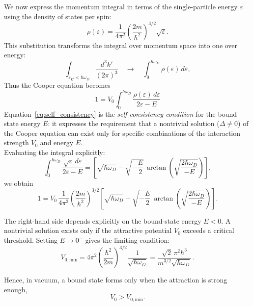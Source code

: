 We now express the momentum integral in terms of the single-particle energy \(\varepsilon\)
using the density of states per spin:
\[
\rho(\varepsilon) =
\frac{1}{4\pi^2}
\left(\frac{2m}{\hbar^2}\right)^{3/2}\!\sqrt{\varepsilon}.
\]
This substitution transforms the integral over momentum space into one over energy:
\[
\int_{\varepsilon_{\mathbf k'}<\hbar\omega_D}
\frac{d^3k'}{(2\pi)^3}
\quad \rightarrow \quad 
\int_0^{\hbar\omega_D} \rho(\varepsilon)\, d\varepsilon,
\]
Thus the Cooper equation becomes
\begin{equation}
\boxed{
1 = V_0 \int_0^{\hbar\omega_D}
\frac{\rho(\varepsilon)\, d\varepsilon}{2\varepsilon - E}}
\label{eq:self_consistency}
\end{equation}
Equation~\eqref{eq:self_consistency} is the \textit{self-consistency condition} for the bound-state energy \(E\):
it expresses the requirement that a nontrivial solution (\(\Delta \neq 0\)) of the Cooper equation
can exist only for specific combinations of the interaction strength \(V_0\) and energy \(E\).\\
Evaluating the integral explicitly:
\[
\int_0^{\hbar\omega_D}\!\!\frac{\sqrt{\varepsilon}\,d\varepsilon}{2\varepsilon - E}
=
\left[
\sqrt{\hbar\omega_D}
- \sqrt{-\frac{E}{2}}\,
\arctan\!\left(\sqrt{\frac{2\hbar\omega_D}{-E}}\right)
\right],
\]
we obtain
\[
1 = V_0\,\frac{1}{4\pi^2}
\left(\frac{2m}{\hbar^2}\right)^{3/2}
\left[
\sqrt{\hbar\omega_D}
- \sqrt{-\frac{E}{2}}\,
\arctan\!\left(\sqrt{\frac{2\hbar\omega_D}{-E}}\right)
\right].
\]

The right-hand side depends explicitly on the bound-state energy \(E<0\).  
A nontrivial solution exists only if the attractive potential \(V_0\) exceeds a critical threshold.  
Setting \(E \to 0^{-}\) gives the limiting condition:
\begin{equation}
\boxed{
V_{0,\text{min}} = 4\pi^2
\left(\frac{\hbar^2}{2m}\right)^{3/2}
\frac{1}{\sqrt{\hbar\omega_D}}
= \frac{\sqrt{2}\,\pi^2\hbar^3}{m^{3/2}\sqrt{\hbar\omega_D}}}\,.
\label{eq:V0min}
\end{equation}

Hence, in vacuum, a bound state forms only when the attraction is strong enough, \[V_0 > V_{0,\mathrm{min}}.\]  

